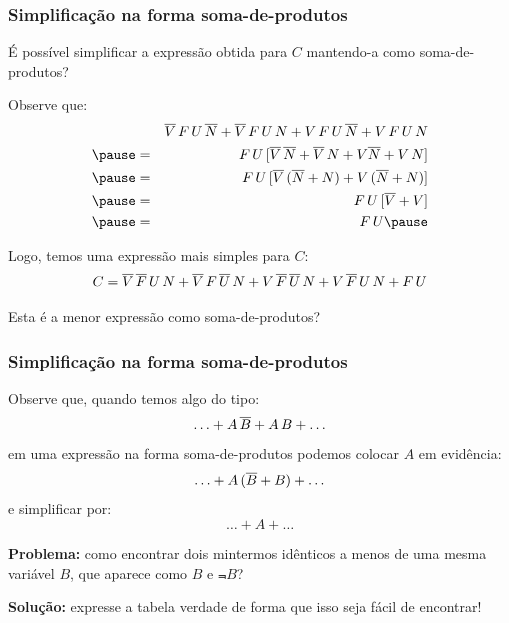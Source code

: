 \documentclass{beamer}
\begin{document}
\begin{frame}
\frametitle{Simplificação na forma soma-de-produtos}

É possível simplificar a expressão obtida para $C$ mantendo-a
como soma-de-produtos?

\vspace{6pt}

Observe que:
\begin{eqnarray*}
&   & \Not{V} \And F \And U \And \Not{N} + \Not{V} \And F \And U \And N +
      V \And F \And U \And \Not{N} + V \And F \And U \And N\\ \pause
& = & F \And U \And [ \Not{V} \And \Not{N} + \Not{V} \And N + V \Not{N} + V \And N ] \\ \pause
& = & F \And U \And [ \Not{V} \And ( \Not{N} + N ) + V \And ( \Not{N} + N ) ] \\ \pause
& = & F \And U \And [ \Not{V} + V ] \\ \pause
& = & F \And U \pause
\end{eqnarray*}

Logo, temos uma expressão mais simples para $C$:
$$C = \overline{V} \, \overline{F} \, U \, N + \overline{V} \, F \, \overline{U} \, N +
V \, \overline{F} \, \overline{U} \, N + V \, \overline{F} \, U \, N + F \, U$$

Esta é a menor expressão como soma-de-produtos?
\end{frame}

\begin{frame}
\frametitle{Simplificação na forma soma-de-produtos}

Observe que, quando temos algo do tipo:
$$
\ldots + A \, \overline{B} + A \, B + \ldots
$$
em uma expressão na forma soma-de-produtos podemos
colocar $A$ em evidência:
$$
\ldots + A \, ( \overline{B} + B ) + \ldots
$$
e simplificar por:
$$
\ldots + A + \ldots
$$

\vspace{6pt} \pause

\textbf{Problema:} como encontrar dois mintermos idênticos
a menos de uma mesma variável $B$, que aparece como
$B$ e $\Not{B}$?

\vspace{6pt} \pause

\textbf{Solução:} expresse a tabela verdade de forma que
isso seja fácil de encontrar!
\end{frame}

\def\Zero{\raisebox{0pt}{\color{structure.fg!70!white}0}}
\end{document}
